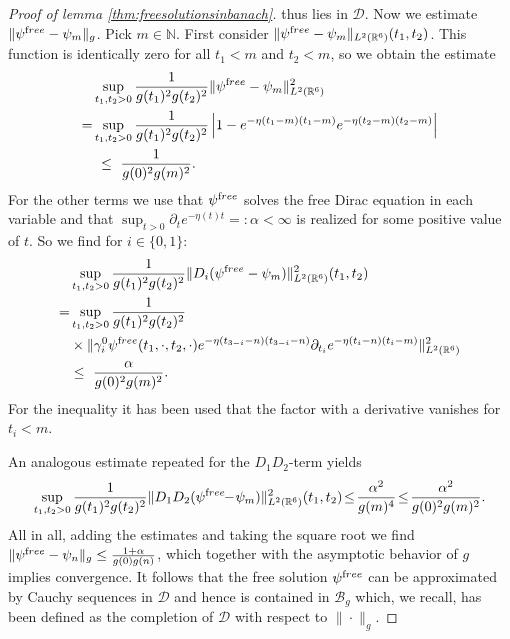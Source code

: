 \documentclass[b5paper,draft,openbib,12pt]{memoir}
\newcommand{\free}{{\textup free}}
\begin{document}
\begin{proof}[Proof of lemma \ref{thm:freesolutionsinbanach}]
 thus lies in \(\mathscr{D}\). Now we estimate
  \(\|\psi^\free-\psi_m\|_g\). Pick \(m\in\mathbb{N}\). First 
  consider \(\|\psi^\free -\psi_m\|_{L^2(\mathbb{R}^6)}(t_1,t_2)\). 
  This function is identically zero for all \(t_1<m\) and 
  \(t_2<m\), so we obtain the estimate
 \begin{align}
    & \sup_{t_1,t_2>0} \frac{1}{g(t_1)^2g(t_2)^2} \|\psi^\free- \psi_m\|^2_{L^2(\mathbb{R}^6)}\nonumber\\
     =&\sup_{t_1,t_2>0} \frac{1}{g(t_1)^2g(t_2)^2} \left|1-e^{-\eta(t_1-m)(t_1-m)}e^{-\eta(t_2-m)(t_2-m)}\right|\\
     & ~\le~\frac{1}{g(0)^2g(m)^2}.
\end{align}
For the other terms we use that \(\psi^\free\) solves the free Dirac 
equation in each variable and that 
\(\sup_{t>0}\partial_{t} e^{-\eta(t)t}=:\alpha<\infty\) is realized 
for some positive value of \(t\). So we find for \(i\in \{0,1\}\):
 \begin{align}
& \sup_{t_1,t_2>0}\frac{1}{g(t_1)^2g(t_2)^2}\|D_i (\psi^\free-\psi_m)\|^2_{L^2(\mathbb{R}^6)}(t_1,t_2)\nonumber\\
= &\sup_{t_1,t_2>0}\frac{1}{g(t_1)^2g(t_2)^2}
 \\
 &\times\|\gamma_{i}^0 \psi^\free(t_1,\cdot,t_2,\cdot) e^{-\eta(t_{3-i}-n)(t_{3-i}-n)}\partial_{t_i}e^{-\eta(t_i-n)(t_i-m)} \|^2_{L^2(\mathbb{R}^6)}\\
 &\le~ \frac{\alpha}{g(0)^2g(m)^2}.
 \end{align}
For the inequality it has been used that the factor with a 
derivative vanishes for \(t_i<m\). 

An analogous estimate repeated for the \(D_1D_2\)-term yields
\begin{equation*}
     \sup_{t_1,t_2>0} \frac{1}{g(t_1)^2g(t_2)^2}\|D_1D_2(\psi^\free \!\!-\! \psi_m)\|^2_{L^2(\mathbb{R}^6)}(t_1,t_2)\!\le\! \frac{\alpha^2}{g(m)^4} \!\le\! \frac{\alpha^2}{g(0)^2g(m)^2}.
 \end{equation*}
All in all, adding the estimates and taking the square root we 
find \(\|\psi^\free - \psi_n\|_g \le \frac{1+\alpha}{g(0)g(n)}\), which 
together with the asymptotic behavior of \(g\) implies convergence. 
It follows that the free solution \(\psi^\free\) can be approximated 
by Cauchy sequences in \(\mathscr{D}\) and hence is contained in 
\(\mathscr{B}_g\) which, we recall, has been defined as the 
completion of $\mathscr{D}$ with respect to $\| \cdot \|_g$. 
\end{proof}
\end{document}
